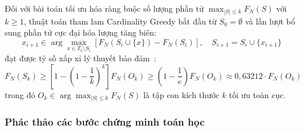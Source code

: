 \begin{hq}
\label{hq:nemhauser_bound}
Đối với bài toán tối ưu hóa ràng buộc số lượng phần tử $\max_{|S| \le k} F_N(S)$ với $k \ge 1$, thuật toán tham lam Cardinality Greedy bắt đầu từ $S_0 = \emptyset$ và lần lượt bổ sung phần tử cực đại hóa lượng tăng biên:
\begin{equation}
x_{i+1} \in \arg\max_{x \in T_b \setminus S_i} \left[ F_N(S_i \cup \{x\}) - F_N(S_i) \right], \quad S_{i+1} = S_i \cup \{x_{i+1}\}
\end{equation}
đạt được tỷ số xấp xỉ lý thuyết bảo đảm~\cite{nemhauser1978analysis}:
\begin{equation}
F_N(S_k) \ge \left[ 1 - \left(1 - \frac{1}{k}\right)^k \right] F_N(O_k) \ge \left(1 - \frac{1}{e}\right) F_N(O_k) \approx 0{,}63212 \cdot F_N(O_k)
\end{equation}
trong đó $O_k \in \arg\max_{|S| \le k} F_N(S)$ là tập con kích thước $k$ tối ưu toàn cục.
\end{hq}

\subsubsection{Phác thảo các bước chứng minh toán học}
\label{subsubsec:proof_sketch}

